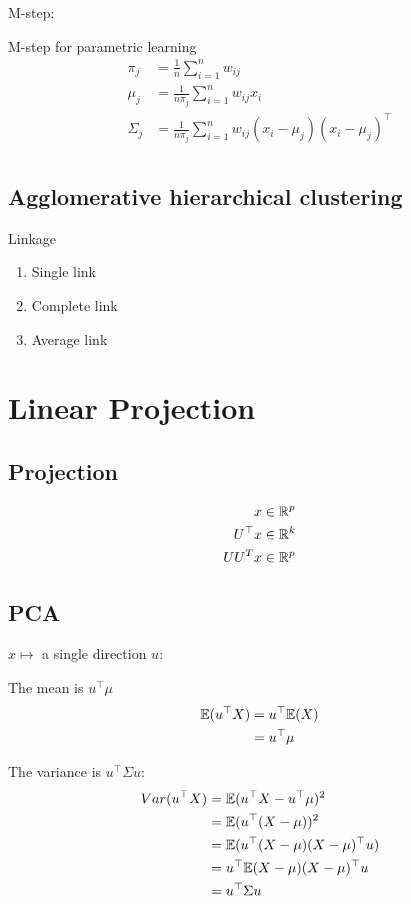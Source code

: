 \documentclass[a4paper]{report}
\begin{document}
M-step:

M-step for parametric learning 
\begin{align*}
\pi_j &= \frac{1}{n} \sum_{i=1}^n w_{ij} \\
\mu_j &= \frac{1}{n\pi_j} \sum_{i=1}^n w_{ij} x_i \\
\Sigma_j &= \frac{1}{n\pi_j} \sum_{i=1}^n w_{ij}(x_i-\mu_j)(x_i-\mu_j)^\top
\end{align*}
\begin{align*}

\end{align*}
\section{Agglomerative hierarchical clustering}
Linkage
\begin{enumerate}
\item Single link
\item Complete link 
\item Average link 
\end{enumerate}


\chapter{Linear Projection}
\section{Projection}
\begin{align*}
x &\in \mathbb{R}^p\\
U^\top x &\in \mathbb{R}^k \\
UU^Tx &\in \mathbb{R}^p
\end{align*}

\section{PCA}
$x \mapsto$ a single direction $u$:

The mean is $u^\top\mu$
\begin{align*}
\mathbb{E}(u^\top X) &= u^\top \mathbb{E}(X) \\
&= u^\top \mu
\end{align*}

The variance is $u^\top \Sigma u$:
\begin{align*}
Var(u^\top X) &= \mathbb{E}(u^\top X-u^\top \mu)^2\\
&= \mathbb{E}(u^\top(X-\mu))^2\\
&= \mathbb{E}(u^\top(X-\mu)(X-\mu)^\top u)\\
&= u^\top \mathbb{E}(X-\mu)(X-\mu)^\top u  \\
&= u^\top \Sigma u
\end{align*}
\end{document}
